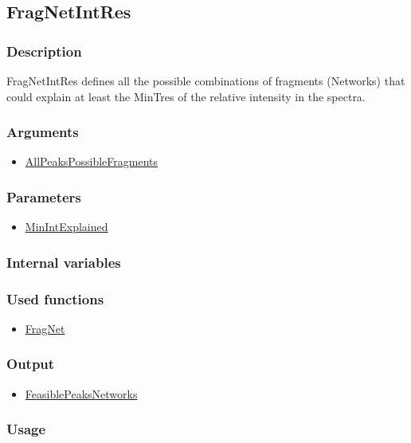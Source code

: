 \subsection{FragNetIntRes}\label{FragNetIntRes}
\subsubsection{Description}
FragNetIntRes defines all the possible combinations of fragments (Networks) that could explain at least the MinTres of the relative intensity in the spectra.
\subsubsection{Arguments}
\begin{itemize}
\item \hyperref[AllPeaksPossibleFragments]{AllPeaksPossibleFragments}
\end{itemize}
\subsubsection{Parameters}
\begin{itemize}
\item \hyperref[MinIntExplained]{MinIntExplained}
\end{itemize}
\subsubsection{Internal variables}
\subsubsection{Used functions}
\begin{itemize}
\item \hyperref[FragNet]{FragNet}
\end{itemize}
\subsubsection{Output}
\begin{itemize}
\item \hyperref[FeasiblePeaksNetworks]{FeasiblePeaksNetworks}
\end{itemize}
\subsubsection{Usage}



